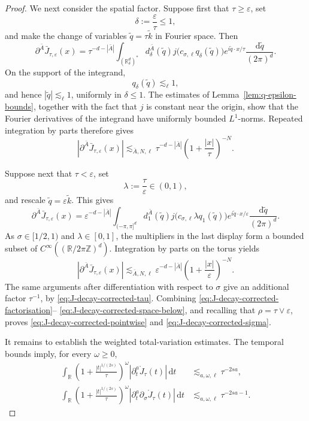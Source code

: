 \documentclass{article}
\numberwithin{equation}{section}
\newcommand{\assign}{:=}
\newcommand{\mathd}{\mathrm{d}}
\theoremstyle{plain}
\theoremstyle{definition}
\begin{document}
\begin{proof}
	We next consider the spatial factor.  Suppose first
	that \(\tau\geq\varepsilon\), set
	\[
	\delta\assign\frac{\varepsilon}{\tau}\leq1,
	\]
	and make the change of variables \(\tilde q=\tau\tilde k\) in Fourier space.
	Then
	\[
	\partial^{\bar A}\bar J_{\tau,\varepsilon}(x)
	=\tau^{-d-|\bar A|}
	\int_{(\mathbb R_\delta^d)^*}
	d_\delta^{\bar A}(\tilde q)
	j\bigl(c_{\sigma,\ell}q_\delta(\tilde q)\bigr)
	e^{i\tilde q\cdot x/\tau}
	\frac{\mathd\tilde q}{(2\pi)^d}.
	\]
	On the support of the integrand,
	\[
	q_\delta(\tilde q)\lesssim_\ell1,
	\]
	and hence \(|\tilde q|\lesssim_\ell1\), uniformly in \(\delta\leq1\).
	The estimates of Lemma~\ref{lem:q-epsilon-bounds}, together with the fact
	that \(j\) is constant near the origin, show that the Fourier derivatives
	of the integrand have uniformly bounded \(L^1\)-norms.  Repeated
	integration by parts therefore gives
	\begin{equation}
		|\partial^{\bar A}\bar J_{\tau,\varepsilon}(x)|
		\lesssim_{\bar A,N,\ell}
		\tau^{-d-|\bar A|}
		\left(1+\frac{|x|}{\tau}\right)^{-N}.
		\label{eq:J-decay-corrected-space-above}
	\end{equation}
	
	Suppose next that \(\tau<\varepsilon\), set
	\[
	\lambda\assign\frac{\tau}{\varepsilon}\in(0,1),
	\]
	and rescale \(\tilde q=\varepsilon\tilde k\).  This gives
	\[
	\partial^{\bar A}\bar J_{\tau,\varepsilon}(x)
	=\varepsilon^{-d-|\bar A|}
	\int_{(-\pi,\pi]^d}
	d_1^{\bar A}(\tilde q)
	j\bigl(c_{\sigma,\ell}\lambda q_1(\tilde q)\bigr)
	e^{i\tilde q\cdot x/\varepsilon}
	\frac{\mathd\tilde q}{(2\pi)^d}.
	\]
	As \(\sigma\in[1/2,1)\) and \(\lambda\in[0,1]\), the multipliers in the
	last display form a bounded subset of
	\(C^\infty((\mathbb R/2\pi\mathbb Z)^d)\).  Integration by parts on the
	torus yields
	\begin{equation}
		|\partial^{\bar A}\bar J_{\tau,\varepsilon}(x)|
		\lesssim_{\bar A,N,\ell}
		\varepsilon^{-d-|\bar A|}
		\left(1+\frac{|x|}{\varepsilon}\right)^{-N}.
		\label{eq:J-decay-corrected-space-below}
	\end{equation}
	The same arguments after differentiation with respect to \(\sigma\)
	give an additional factor \(\tau^{-1}\), by
	\eqref{eq:J-decay-corrected-tau}.
	Combining \eqref{eq:J-decay-corrected-factorisation}--
	\eqref{eq:J-decay-corrected-space-below}, and recalling that
	\(\rho=\tau\vee\varepsilon\), proves
	\eqref{eq:J-decay-corrected-pointwise} and
	\eqref{eq:J-decay-corrected-sigma}.
	
	It remains to establish the weighted total-variation estimates.  The
	temporal bounds imply, for every \(\omega\geq0\),
	\begin{align}
		\int_{\mathbb R}
		\left(1+\frac{|t|^{1/(2s)}}{\tau}\right)^\omega
		|\partial_t^a\mathring J_\tau(t)|\,\mathd t
		&\lesssim_{a,\omega,\ell}\tau^{-2sa},
		\label{eq:J-decay-corrected-time-TV-proof}
		\\
		\int_{\mathbb R}
		\left(1+\frac{|t|^{1/(2s)}}{\tau}\right)^\omega
		|\partial_t^a\partial_\sigma
		\mathring J_\tau(t)|\,\mathd t
		&\lesssim_{a,\omega,\ell}\tau^{-2sa-1}.
		\label{eq:J-decay-corrected-time-sigma-TV-proof}
	\end{align}
	

\end{proof}
\end{document}
